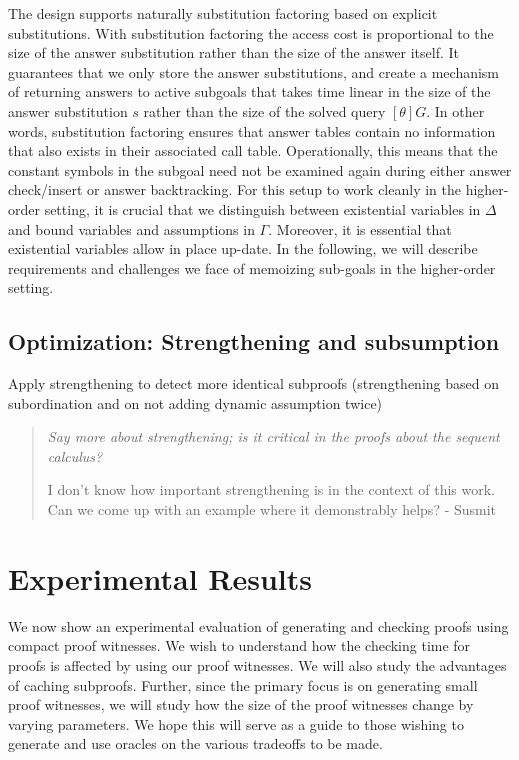 \documentclass{acmconf}
\newenvironment{note}{\begin{quote}\message{note!}\it}{\end{quote}}
\begin{document}
The design supports naturally substitution factoring based on explicit
substitutions\cite{RamakrishnanJLP99}. With substitution factoring the
access cost is proportional to the size of the answer substitution
rather than the size of the answer itself. It guarantees that we only
store the answer substitutions, and create a mechanism of returning
answers to active subgoals that takes time linear in the size of the
answer substitution $s$ rather than the size of the solved query
$[\theta]G$. In other words, substitution factoring ensures that answer
tables contain no information that also exists in their associated
call table. Operationally, this means that the constant symbols in the
subgoal need not be examined again during either answer check/insert
or answer backtracking. For this setup to work
cleanly in the higher-order setting, it is crucial that we distinguish
between existential variables in $\Delta$ and bound variables and
assumptions in $\Gamma$. Moreover, it is essential that existential
variables allow in place up-date.  In the following, we will describe
requirements and challenges we face of memoizing sub-goals in the
higher-order setting. 

\subsection{Optimization: Strengthening and subsumption}

Apply strengthening to detect more identical subproofs (strengthening
based on subordination and on not adding dynamic assumption twice)

\begin{note}
  Say more about strengthening; is it critical in the proofs about the
  sequent calculus?  

  I don't know how important strengthening is in the context of this work.
  Can we come up with an example where it demonstrably helps? - Susmit
\end{note}

\section{Experimental Results}

We now show an experimental evaluation of generating and checking
proofs using compact proof witnesses. We wish to understand how the
checking time for proofs is affected by using our proof witnesses. We
will also study the advantages of caching subproofs. Further, since
the primary focus is on generating small proof witnesses, we will
study how the size of the proof witnesses change by varying
parameters. We hope this will serve as a guide to those wishing to 
generate and use oracles on the various tradeoffs to be made.
\end{document}
